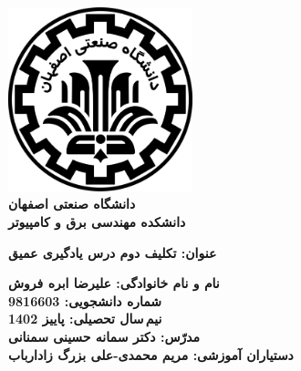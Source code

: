 \begin{titlepage}
\begin{center}
\includegraphics[width=0.4\textwidth]{figures/IUT Logo.png}\\
        
\LARGE
\textbf{دانشگاه صنعتی اصفهان}\\
\textbf{دانشکده مهندسی برق و کامپیوتر}\\
        
\vfill
        
\huge
\textbf{عنوان: تکلیف دوم درس یادگیری عمیق}\\
        
\vfill
        
\LARGE
\textbf{نام و نام خانوادگی: علیرضا ابره فروش}\\
\textbf{شماره دانشجویی: 9816603}\\
\textbf{نیم\,سال تحصیلی: پاییز 1402}\\
\textbf{مدرّس: دکتر سمانه حسینی سمنانی}\\
\textbf{دستیاران آموزشی: مریم محمدی-علی بزرگ زادارباب}\\
\end{center}
\end{titlepage}
